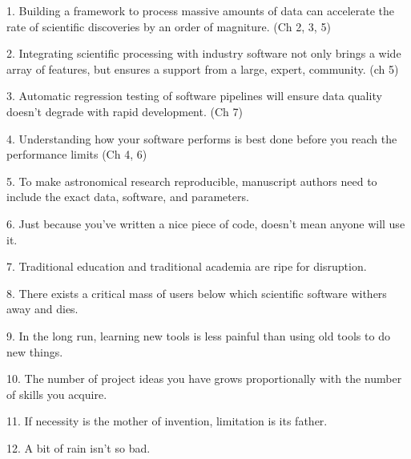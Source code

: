 1. Building a framework to process massive amounts of data can accelerate the rate of scientific discoveries by an order of magniture. (Ch 2, 3, 5)

2. Integrating scientific processing with industry software not only brings a wide array of features, but ensures a support from a large, expert, community. (ch 5)

3. Automatic regression testing of software pipelines will ensure data quality doesn't degrade with rapid development. (Ch 7)

4. Understanding how your software performs is best done before you reach the performance limits (Ch 4, 6) 

5. To make astronomical research reproducible, manuscript authors need to include the exact data, software, and parameters. 

6. Just because you've written a nice piece of code, doesn't mean anyone will use it.  

7. Traditional education and traditional academia are ripe for disruption. 

8. There exists a critical mass of users below which scientific software withers away and dies.

9. In the long run, learning new tools is less painful than using old tools to do new things. 

10. The number of project ideas you have grows proportionally with the number of skills you acquire.

11. If necessity is the mother of invention, limitation is its father.

12. A bit of rain isn't so bad.
